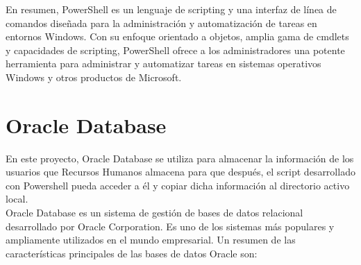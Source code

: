 \documentclass[a4paper, 12pt]{book}
\begin{document}
En resumen, PowerShell es un lenguaje de scripting y una interfaz de línea de comandos diseñada para la administración y automatización de tareas en entornos Windows. Con su enfoque orientado a objetos, amplia gama de cmdlets y capacidades de scripting, PowerShell ofrece a los administradores una potente herramienta para administrar y automatizar tareas en sistemas operativos Windows y otros productos de Microsoft.



\section{Oracle Database} 
\label{sec:Oracle Database}

En este proyecto, Oracle Database se utiliza para almacenar la información de los usuarios que Recursos Humanos almacena para que después, el script desarrollado con Powershell pueda acceder a él y copiar dicha información al directorio activo local.
\\

Oracle Database es un sistema de gestión de bases de datos relacional desarrollado por Oracle Corporation. Es uno de los sistemas más populares y ampliamente utilizados en el mundo empresarial. Un resumen de las características principales de las bases de datos Oracle son:
\end{document}
